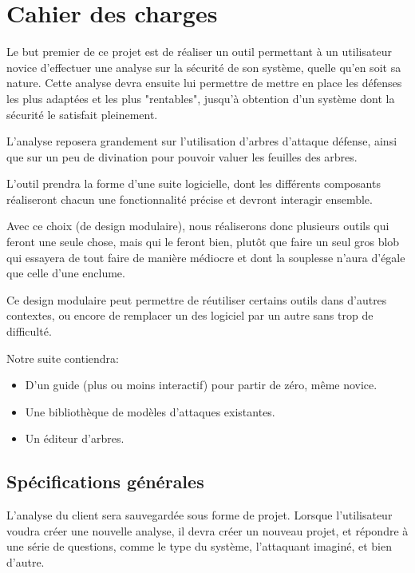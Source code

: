 \section{Cahier des charges}
    Le but premier de ce projet est de réaliser un outil permettant à un utilisateur novice d'effectuer une analyse sur la sécurité de son système, quelle qu'en soit sa nature. Cette analyse devra ensuite lui permettre de mettre en place les défenses les plus adaptées et les plus "rentables", jusqu'à obtention d'un système dont la sécurité le satisfait pleinement.
    
    L'analyse reposera grandement sur l'utilisation d'arbres d'attaque défense, ainsi que sur un peu de divination pour pouvoir valuer les feuilles des arbres.
    
    L'outil prendra la forme d'une suite logicielle, dont les différents composants réaliseront chacun une fonctionnalité précise et devront interagir ensemble.
    
    Avec ce choix (de design modulaire), nous réaliserons donc plusieurs outils qui feront une seule chose, mais qui le feront bien, plutôt que faire un seul gros blob qui essayera de tout faire de manière médiocre et dont la souplesse n'aura d'égale que celle d'une enclume.
    
    Ce design modulaire peut permettre de réutiliser certains outils dans d'autres contextes, ou encore de remplacer un des logiciel par un autre sans trop de difficulté. 
    
    Notre suite contiendra:
    \begin{itemize}
        \item D'un guide (plus ou moins interactif) pour partir de zéro, même novice.
    	\item Une bibliothèque de modèles d'attaques existantes.
        \item Un éditeur d'arbres.
    \end{itemize}
    
    \subsection{Spécifications générales}
        L'analyse du client sera sauvegardée sous forme de projet. Lorsque l'utilisateur voudra créer une nouvelle analyse, il devra créer un nouveau projet, et répondre à une série de questions, comme le type du système, l'attaquant imaginé, et bien d'autre.
        
